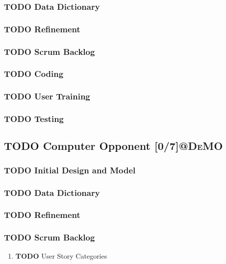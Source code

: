 \documentclass[11pt]{article}
\begin{document}
\subsubsection{{\bfseries\sffamily TODO} Data Dictionary}
\label{sec:orge1f282f}
\subsubsection{{\bfseries\sffamily TODO} Refinement}
\label{sec:orgfa99e42}
\subsubsection{{\bfseries\sffamily TODO} Scrum Backlog}
\label{sec:org7c9efd2}
\subsubsection{{\bfseries\sffamily TODO} Coding}
\label{sec:org94d947f}
\subsubsection{{\bfseries\sffamily TODO} User Training}
\label{sec:orgf8d0d90}
\subsubsection{{\bfseries\sffamily TODO} Testing}
\label{sec:org9f8b595}
\subsection{{\bfseries\sffamily TODO} Computer Opponent  [0/7]\hfill{}\textsc{@DeMO}}
\label{sec:org80bb91e}
\subsubsection{{\bfseries\sffamily TODO} Initial Design and Model}
\label{sec:orga87c817}
\subsubsection{{\bfseries\sffamily TODO} Data Dictionary}
\label{sec:org13c8b24}
\subsubsection{{\bfseries\sffamily TODO} Refinement}
\label{sec:org40f55ff}
\subsubsection{{\bfseries\sffamily TODO} Scrum Backlog}
\label{sec:org4efd6ae}
\begin{enumerate}
\item {\bfseries\sffamily TODO} User Story Categories
\label{sec:org52d78bf}
\end{enumerate}
\end{document}
